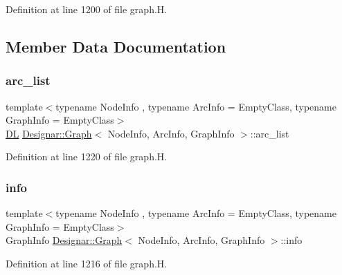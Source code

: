Definition at line 1200 of file graph.\+H.



\subsection{Member Data Documentation}
\mbox{\label{class_designar_1_1_graph_a8c809db7848c78f6718aad466ee959b2}} 
\subsubsection{\texorpdfstring{arc\+\_\+list}{arc\_list}}
{\footnotesize\ttfamily template$<$typename Node\+Info , typename Arc\+Info  = Empty\+Class, typename Graph\+Info  = Empty\+Class$>$ \\
\hyperlink{class_designar_1_1_d_l}{DL} \hyperlink{class_designar_1_1_graph}{Designar\+::\+Graph}$<$ Node\+Info, Arc\+Info, Graph\+Info $>$\+::arc\+\_\+list\hspace{0.3cm}{\ttfamily [protected]}}



Definition at line 1220 of file graph.\+H.

\mbox{\label{class_designar_1_1_graph_a2a8b41ce641ad2fb1b84a4d6b024bb1a}} 
\subsubsection{\texorpdfstring{info}{info}}
{\footnotesize\ttfamily template$<$typename Node\+Info , typename Arc\+Info  = Empty\+Class, typename Graph\+Info  = Empty\+Class$>$ \\
Graph\+Info \hyperlink{class_designar_1_1_graph}{Designar\+::\+Graph}$<$ Node\+Info, Arc\+Info, Graph\+Info $>$\+::info\hspace{0.3cm}{\ttfamily [protected]}}



Definition at line 1216 of file graph.\+H.

\mbox{\label{class_designar_1_1_graph_a31b0117b6d87816f703a4a5baa1fa6ce}} 

